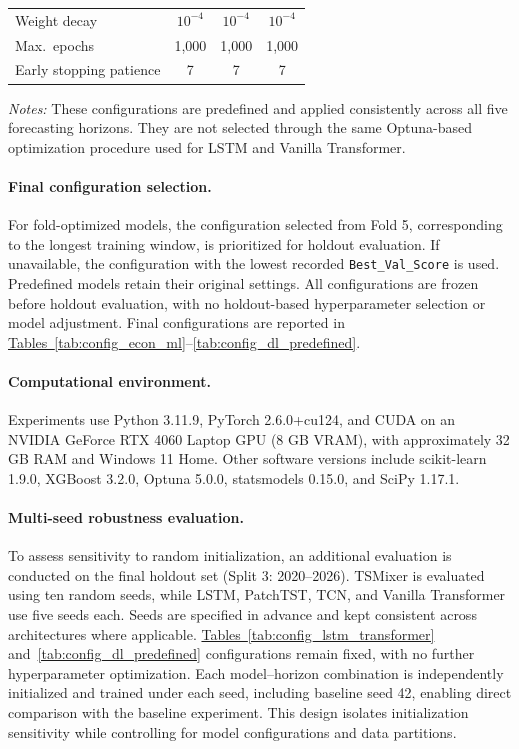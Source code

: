 \documentclass[runningheads,orivec]{llncs}
\begin{document}
\begin{table}[htbp]
\begin{tabular}{lccc}
Weight decay            & $10^{-4}$    & $10^{-4}$ & $10^{-4}$ \\
Max.\ epochs            & 1,000        & 1,000   & 1,000 \\
Early stopping patience & 7            & 7       & 7 \\
\hline
\end{tabular}
\par\vspace{4pt}\parbox{\linewidth}{\scriptsize\textit{Notes:} These configurations are predefined and applied consistently across all five forecasting horizons. They are not selected through the same Optuna-based optimization procedure used for LSTM and Vanilla Transformer.}
\end{table}

\paragraph{Final configuration selection.} For fold-optimized models, the configuration selected from Fold 5, corresponding to the longest training window, is prioritized for holdout evaluation. If unavailable, the configuration with the lowest recorded \texttt{Best\_Val\_Score} is used. Predefined models retain their original settings. All configurations are frozen before holdout evaluation, with no holdout-based hyperparameter selection or model adjustment. Final configurations are reported in \hyperref[tab:config_econ_ml]{Tables~\ref*{tab:config_econ_ml}}--\hyperref[tab:config_dl_predefined]{\ref*{tab:config_dl_predefined}}.

\paragraph{Computational environment.} Experiments use Python 3.11.9, PyTorch 2.6.0+cu124, and CUDA on an NVIDIA GeForce RTX 4060 Laptop GPU (8 GB VRAM), with approximately 32 GB RAM and Windows 11 Home. Other software versions include scikit-learn 1.9.0, XGBoost 3.2.0, Optuna 5.0.0, statsmodels 0.15.0, and SciPy 1.17.1.

\paragraph{Multi-seed robustness evaluation.} To assess sensitivity to random initialization, an additional evaluation is conducted on the final holdout set (Split 3: 2020--2026). TSMixer is evaluated using ten random seeds, while LSTM, PatchTST, TCN, and Vanilla Transformer use five seeds each. Seeds are specified in advance and kept consistent across architectures where applicable. \hyperref[tab:config_lstm_transformer]{Tables~\ref*{tab:config_lstm_transformer}} and~\hyperref[tab:config_dl_predefined]{\ref*{tab:config_dl_predefined}} configurations remain fixed, with no further hyperparameter optimization. Each model--horizon combination is independently initialized and trained under each seed, including baseline seed 42, enabling direct comparison with the baseline experiment. This design isolates initialization sensitivity while controlling for model configurations and data partitions.
\end{document}
